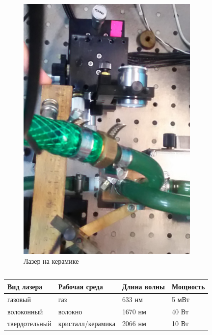 \documentclass[10pt,pdf,hyperref={unicode}, dvipsnames]{beamer}
\begin{document}
\begin{frame}[t]
\begin{columns}
\begin{column}{0.3\textwidth}
\begin{figure}[h]
				\includegraphics[width=0.8\textwidth]{photo/las_s}
				\caption{Лазер на керамике}
			\end{figure}	
		\end{column}		
	\end{columns}
	\begin{center}
  \begin{tabular}{*{4}{l}}
    \toprule
    Вид лазера & Рабочая среда & Длина волны & Мощность \\
    \midrule
    газовый & газ & 633 нм & 5  мВт\\
    \midrule
    волоконный & волокно & 1670 нм & 40 Вт\\
    \midrule
    твердотельный & кристалл/керамика & 2066 нм & 10 Вт\\
    \bottomrule
  \end{tabular}		
	\end{center}
\end{frame}
\end{document}
